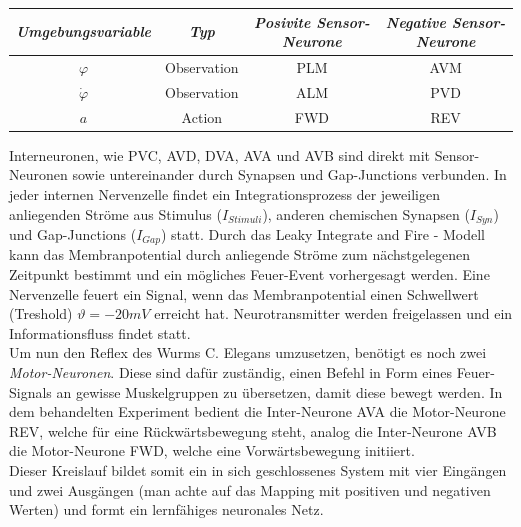 	\begin{center}
	\begin{tabular}{c@{\hskip 0.5cm}c@{\hskip 0.5cm}c@{\hskip 0.5cm}c}    \toprule
		\setlength{\tabcolsep}{50pt}
		\renewcommand{\arraystretch}{1.5}
		\emph{Umgebungsvariable} & \emph{Typ}  & \emph{Posivite Sensor-Neurone} & \emph{Negative Sensor-Neurone} \\\midrule
		$\varphi$ 				 & Observation & PLM							& AVM							 \\ 
		$\dot{\varphi}$		 	 & Observation & ALM							& PVD							 \\
		$a$						 & Action	   & FWD							& REV							 \\\bottomrule
		\hline
	\end{tabular}
	\end{center}
	Interneuronen, wie PVC, AVD, DVA, AVA und AVB sind direkt mit Sensor-Neuronen sowie untereinander durch Synapsen und Gap-Junctions verbunden. In jeder internen Nervenzelle findet ein Integrationsprozess der jeweiligen anliegenden Ströme aus Stimulus ($I_{Stimuli}$), anderen chemischen Synapsen ($I_{Syn}$) und Gap-Junctions ($I_{Gap}$) statt. Durch das Leaky Integrate and Fire - Modell kann das Membranpotential durch anliegende Ströme zum nächstgelegenen Zeitpunkt bestimmt und ein mögliches Feuer-Event vorhergesagt werden. Eine Nervenzelle feuert ein Signal, wenn das Membranpotential einen Schwellwert (\glqq Treshold\grqq) $\vartheta = -20mV$ erreicht hat. Neurotransmitter werden freigelassen und ein Informationsfluss findet statt.\\
	Um nun den Reflex des Wurms C. Elegans umzusetzen, benötigt es noch zwei \textit{Motor-Neuronen}. Diese sind dafür zuständig, einen Befehl in Form eines Feuer-Signals an gewisse Muskelgruppen zu übersetzen, damit diese bewegt werden. In dem behandelten Experiment bedient die Inter-Neurone AVA die Motor-Neurone REV, welche für eine Rückwärtsbewegung steht, analog die Inter-Neurone AVB die Motor-Neurone FWD, welche eine Vorwärtsbewegung initiiert.\\
	Dieser Kreislauf bildet somit ein in sich geschlossenes System mit vier Eingängen und zwei Ausgängen (man achte auf das Mapping mit positiven und negativen Werten) und formt ein lernfähiges neuronales Netz.
